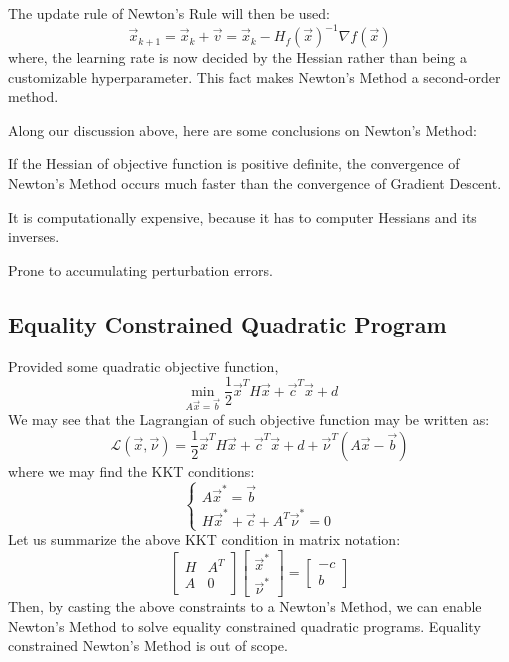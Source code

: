 The update rule of Newton's Rule will then be used:
\[
    \vec{x}_{k + 1} = \vec{x}_k + \vec{v} = \vec{x}_k - {H_f(\vec{x})}^{-1} \nabla f(\vec{x})
\]
where, the learning rate is now decided by the Hessian rather than being a customizable hyperparameter.
This fact makes Newton's Method a second-order method.

Along our discussion above, here are some conclusions on Newton's Method:
\begin{bindenum}
    \item If the Hessian of objective function is positive definite, the convergence of Newton's Method occurs much faster than the convergence of Gradient Descent.
    \item It is computationally expensive, because it has to computer Hessians and its inverses.
    \item Prone to accumulating perturbation errors.
\end{bindenum}

\subsection{Equality Constrained Quadratic Program}
Provided some quadratic objective function,
\[
    \min_{A \vec{x} = \vec{b}} \frac{1}{2} \vec{x}^T H \vec{x} + \vec{c}^T \vec{x} + d
\]
We may see that the Lagrangian of such objective function may be written as:
\[
    \mathcal{L}(\vec{x}, \vec{\nu}) = \frac{1}{2} \vec{x}^T H \vec{x} + \vec{c}^T \vec{x} + d + \vec{\nu}^T (A \vec{x} - \vec{b})
\]
where we may find the KKT conditions:
\[
    \begin{cases}
        A \vec{x}^* = \vec{b} \\
        H \vec{x}^* + \vec{c} + A^T \vec{\nu}^* = 0
    \end{cases}
\]
Let us summarize the above KKT condition in matrix notation:
\[
    \begin{bmatrix} H & A^T \\ A & 0 \end{bmatrix}
    \begin{bmatrix} \vec{x}^* \\ \vec{\nu}^* \end{bmatrix}
    = \begin{bmatrix} -c \\ b \end{bmatrix}
\]
Then, by casting the above constraints to a Newton's Method, we can enable Newton's Method to solve equality constrained quadratic programs.
Equality constrained Newton's Method is out of scope.
